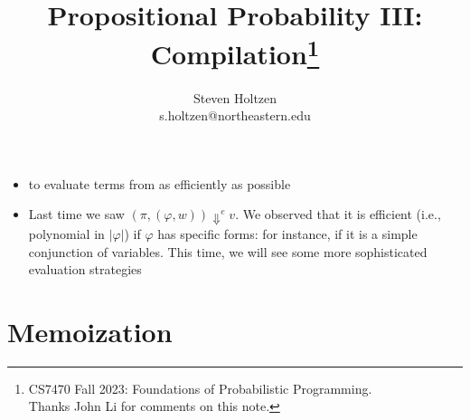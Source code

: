 \documentclass{tufte-handout}
\title{Propositional Probability III: Compilation\thanks{CS7470 Fall 2023: Foundations of Probabilistic Programming.\\Thanks John Li for comments on this note.}}
\author[]{Steven Holtzen\\s.holtzen@northeastern.edu}
\begin{document}
\maketitle%
\begin{itemize}
  \item {} to evaluate terms from \prop{} as efficiently as possible
  \item Last time we saw $(\pi, (\varphi, w)) \Downarrow^e v$. We observed that 
  it is efficient (i.e., polynomial in $|\varphi|$) if $\varphi$ has specific 
  forms: for instance, if it is a simple conjunction of variables. This time, we
  will see some more sophisticated evaluation strategies
\end{itemize}

\section{Memoization}
\end{document}
